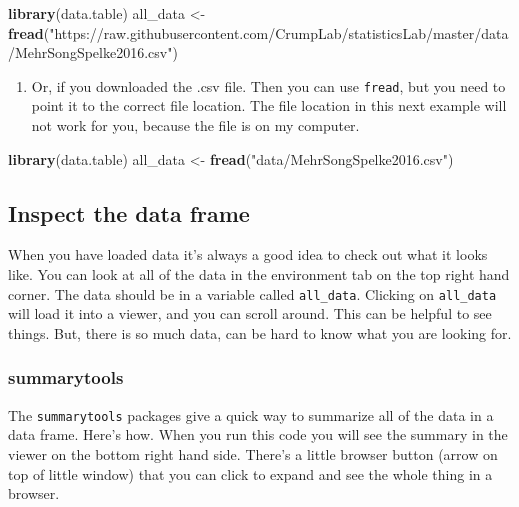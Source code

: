 \documentclass[]{book}
\newenvironment{Shaded}{\begin{snugshade}}{\end{snugshade}}
\newcommand{\KeywordTok}[1]{\textcolor[rgb]{0.13,0.29,0.53}{\textbf{{#1}}}}
\newcommand{\StringTok}[1]{\textcolor[rgb]{0.31,0.60,0.02}{{#1}}}
\newcommand{\NormalTok}[1]{{#1}}
\providecommand{\tightlist}{%
  \setlength{\itemsep}{0pt}\setlength{\parskip}{0pt}}
\theoremstyle{definition}
\theoremstyle{definition}
\theoremstyle{definition}
\theoremstyle{remark}
\begin{document}
\begin{Shaded}
\begin{Highlighting}[]
\KeywordTok{library}\NormalTok{(data.table)}
\NormalTok{all_data <-}\StringTok{ }\KeywordTok{fread}\NormalTok{(}\StringTok{"https://raw.githubusercontent.com/CrumpLab/statisticsLab/master/data/MehrSongSpelke2016.csv"}\NormalTok{)}
\end{Highlighting}
\end{Shaded}

\begin{enumerate}
\def\labelenumi{\arabic{enumi}.}
\setcounter{enumi}{1}
\tightlist
\item
  Or, if you downloaded the .csv file. Then you can use \texttt{fread},
  but you need to point it to the correct file location. The file
  location in this next example will not work for you, because the file
  is on my computer.
\end{enumerate}

\begin{Shaded}
\begin{Highlighting}[]
\KeywordTok{library}\NormalTok{(data.table)}
\NormalTok{all_data <-}\StringTok{ }\KeywordTok{fread}\NormalTok{(}\StringTok{"data/MehrSongSpelke2016.csv"}\NormalTok{)}
\end{Highlighting}
\end{Shaded}

\subsection{Inspect the data frame}\label{inspect-the-data-frame}

When you have loaded data it's always a good idea to check out what it
looks like. You can look at all of the data in the environment tab on
the top right hand corner. The data should be in a variable called
\texttt{all\_data}. Clicking on \texttt{all\_data} will load it into a
viewer, and you can scroll around. This can be helpful to see things.
But, there is so much data, can be hard to know what you are looking
for.

\subsubsection{summarytools}\label{summarytools-1}

The \texttt{summarytools} packages give a quick way to summarize all of
the data in a data frame. Here's how. When you run this code you will
see the summary in the viewer on the bottom right hand side. There's a
little browser button (arrow on top of little window) that you can click
to expand and see the whole thing in a browser.
\end{document}
